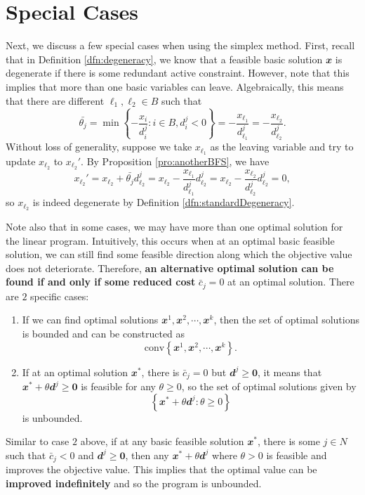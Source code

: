 \documentclass[math, code]{amznotes}
\theoremstyle{remark}
\begin{document}
\section{Special Cases}
Next, we discuss a few special cases when using the simplex method. First, recall that in Definition \ref{dfn:degeneracy}, we know that a feasible basic solution $\mathbfit{x}$ is degenerate if there is some redundant active constraint. However, note that this implies that more than one basic variables can leave. Algebraically, this means that there are different $\ell_1, \ell_2 \in B$ such that 
\begin{equation*}
    \bar{\theta_j} = \min\left\{-\frac{x_i}{d^j_i} \colon i \in B, d^j_i < 0\right\} = -\frac{x_{\ell_1}}{d^j_{\ell_1}} = -\frac{x_{\ell_2}}{d^j_{\ell_2}}.
\end{equation*}
Without loss of generality, suppose we take $x_{\ell_1}$ as the leaving variable and try to update $x_{\ell_2}$ to $x_{\ell_2}'$. By Proposition \ref{pro:anotherBFS}, we have 
\begin{equation*}
    x_{\ell_2}' = x_{\ell_2} + \bar{\theta_j}d^j_{\ell_2} = x_{\ell_2} - \frac{x_{\ell_1}}{d^j_{\ell_1}}d^j_{\ell_2} = x_{\ell_2} - \frac{x_{\ell_2}}{d^j_{\ell_2}}d^j_{\ell_2} = 0,
\end{equation*}
so $x_{\ell_2}$ is indeed degenerate by Definition \ref{dfn:standardDegeneracy}.

Note also that in some cases, we may have more than one optimal solution for the linear program. Intuitively, this occurs when at an optimal basic feasible solution, we can still find some feasible direction along which the objective value does not deteriorate. Therefore, \textbf{an alternative optimal solution can be found if and only if some reduced cost} $\bar{c}_j = 0$ at an optimal solution. There are $2$ specific cases:
\begin{enumerate}
    \item If we can find optimal solutions $\mathbfit{x}^1, \mathbfit{x}^2, \cdots, \mathbfit{x}^k$, then the set of optimal solutions is bounded and can be constructed as 
    \begin{equation*}
        \mathrm{conv}\left\{\mathbfit{x}^1, \mathbfit{x}^2, \cdots, \mathbfit{x}^k\right\}.
    \end{equation*}
    \item If at an optimal solution $\mathbfit{x}^*$, there is $\bar{c}_j = 0$ but $\mathbfit{d}^j \geq \mathbf{0}$, it means that $\mathbfit{x}^* + \theta\mathbfit{d}^j \geq \mathbf{0}$ is feasible for any $\theta \geq 0$, so the set of optimal solutions given by 
    \begin{equation*}
        \left\{\mathbfit{x}^* + \theta\mathbfit{d}^j \colon \theta \geq 0\right\}
    \end{equation*}
    is unbounded.
\end{enumerate}
Similar to case $2$ above, if at any basic feasible solution $\mathbfit{x}^*$, there is some $j \in N$ such that $\bar{c}_j < 0$ and $\mathbfit{d}^j \geq \mathbf{0}$, then any $\mathbfit{x}^* + \theta\mathbfit{d}^j$ where $\theta > 0$ is feasible and improves the objective value. This implies that the optimal value can be \textbf{improved indefinitely} and so the program is unbounded.
\end{document}
